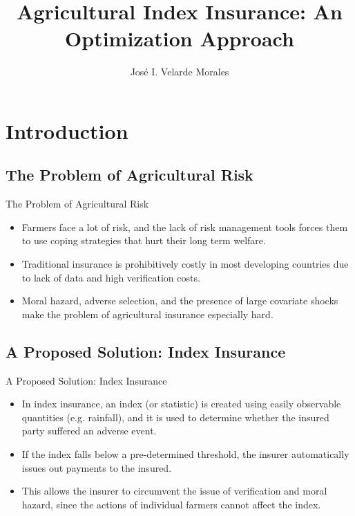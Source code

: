 \documentclass{beamer}
\title[Agricultural Index Insurance]{Agricultural Index Insurance: An Optimization Approach}
\author[José Velarde Morales]{José I. Velarde Morales}
\institute[Chicago Booth]
{

  University of Chicago\\
  Booth School of Business

}
\begin{document}
\beamertemplatenavigationsymbolsempty
\frame{\titlepage}
\section{Introduction}
\subsection*{The Problem of Agricultural Risk}
\begin{frame}{The Problem of Agricultural Risk}
\begin{itemize}
    \setlength\itemsep{2em}
    \item Farmers face a lot of risk, and the lack of risk management tools forces them to use coping strategies that hurt their long term welfare.
   
    \item Traditional insurance is prohibitively costly in most developing countries due to lack of data and high verification costs.

    \item Moral hazard, adverse selection, and the presence of large covariate shocks make the problem of agricultural insurance especially hard. 
\end{itemize}
\end{frame}

\subsection*{A Proposed Solution: Index Insurance}
\begin{frame}{A Proposed Solution: Index Insurance}
\begin{itemize}
   \setlength\itemsep{1em}
    \item In index insurance, an index (or statistic) is created using easily observable quantities (e.g. rainfall), and it is used to determine whether the insured party suffered an adverse event. 
    \item If the index falls below a pre-determined threshold, the insurer automatically issues out payments to the insured. 
    \item This allows the insurer to circumvent the issue of verification and moral hazard, since the actions of individual farmers cannot affect the index.
\end{itemize}
\end{frame}
\end{document}

